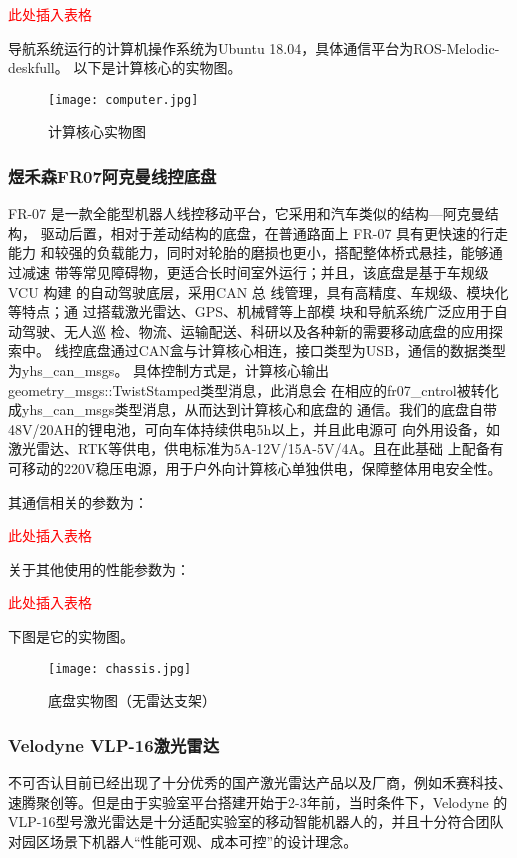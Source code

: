 \textcolor{red}{此处插入表格}

导航系统运行的计算机操作系统为Ubuntu 18.04，具体通信平台为ROS-Melodic-deskfull。
以下是计算核心的实物图。
\begin{figure}[ht]
    \centering
    \texttt{[image: computer.jpg]}
    \caption{计算核心实物图}
\end{figure}


\subsubsection{煜禾森FR07阿克曼线控底盘}
FR-07 是一款全能型机器人线控移动平台，它采用和汽车类似的结构—阿克曼结构，
驱动后置，相对于差动结构的底盘，在普通路面上 FR-07 具有更快速的行走能力
和较强的负载能力，同时对轮胎的磨损也更小，搭配整体桥式悬挂，能够通过减速
带等常见障碍物，更适合长时间室外运行；并且，该底盘是基于车规级 VCU 构建
的自动驾驶底层，采用CAN 总 线管理，具有高精度、车规级、模块化等特点；通
过搭载激光雷达、GPS、机械臂等上部模 块和导航系统广泛应用于自动驾驶、无人巡
检、物流、运输配送、科研以及各种新的需要移动底盘的应用探索中。
线控底盘通过CAN盒与计算核心相连，接口类型为USB，通信的数据类型为yhs\_can\_msgs。
具体控制方式是，计算核心输出geometry\_msgs::TwistStamped类型消息，此消息会
在相应的fr07\_cntrol被转化成yhs\_can\_msgs类型消息，从而达到计算核心和底盘的
通信。我们的底盘自带48V/20AH的锂电池，可向车体持续供电5h以上，并且此电源可
向外用设备，如激光雷达、RTK等供电，供电标准为5A-12V/15A-5V/4A。且在此基础
上配备有可移动的220V稳压电源，用于户外向计算核心单独供电，保障整体用电安全性。

其通信相关的参数为：

\textcolor{red}{此处插入表格}

关于其他使用的性能参数为：

\textcolor{red}{此处插入表格}

下图是它的实物图。
\begin{figure}[ht]
    \centering
    \texttt{[image: chassis.jpg]}
    \caption{底盘实物图（无雷达支架）}
\end{figure}

\subsubsection{Velodyne VLP-16激光雷达}
不可否认目前已经出现了十分优秀的国产激光雷达产品以及厂商，例如禾赛科技、
速腾聚创等。但是由于实验室平台搭建开始于2-3年前，当时条件下，Velodyne
的VLP-16型号激光雷达是十分适配实验室的移动智能机器人的，并且十分符合团队
对园区场景下机器人“性能可观、成本可控”的设计理念。

